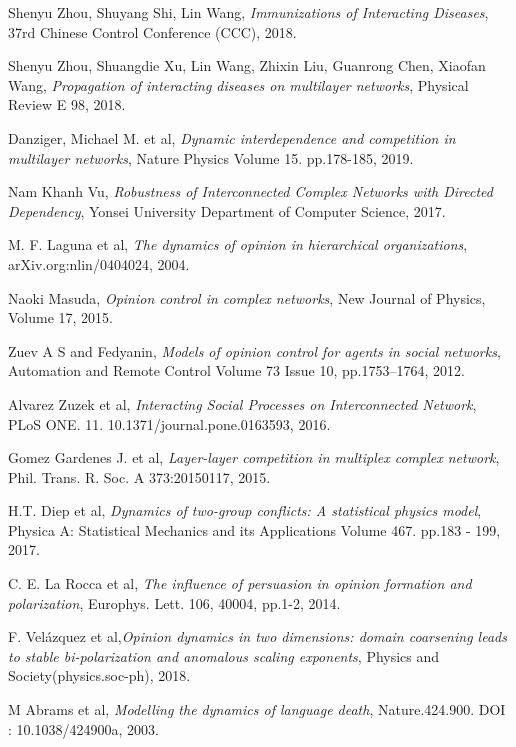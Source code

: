 \documentclass[english]{cccconf}
\begin{document}
\begin{thebibliography}{0}
Shenyu Zhou, Shuyang Shi, Lin Wang, \textit{Immunizations of Interacting Diseases}, 37rd Chinese Control Conference (CCC), 2018.

Shenyu Zhou, Shuangdie Xu, Lin Wang, Zhixin Liu, Guanrong Chen, Xiaofan Wang, \textit{Propagation of interacting diseases on multilayer networks}, Physical Review E 98, 2018. 

Danziger, Michael M. et al, \textit{Dynamic interdependence and competition in multilayer networks}, Nature Physics Volume 15. pp.178-185, 2019.

Nam Khanh Vu, \textit{Robustness of Interconnected Complex Networks with Directed Dependency}, Yonsei University Department of Computer Science, 2017.

M. F. Laguna et al, \textit{The dynamics of opinion in hierarchical organizations}, arXiv.org:nlin/0404024, 2004. 

Naoki Masuda, \textit{Opinion control in complex networks}, New Journal of Physics, Volume 17, 2015.

Zuev A S and Fedyanin, 
\textit{Models of opinion control for agents in social networks}, Automation and Remote Control Volume 73 Issue 10, pp.1753–1764, 2012. 

Alvarez Zuzek et al, \textit{Interacting Social Processes on Interconnected Network}, PLoS ONE. 11. 10.1371/journal.pone.0163593, 2016.

Gomez Gardenes J. et al, \textit{Layer-layer competition in multiplex complex network}, Phil. Trans. R. Soc. A 373:20150117, 2015.

H.T. Diep et al, \textit{Dynamics of two-group conflicts: A statistical physics model}, Physica A: Statistical Mechanics and its Applications Volume 467. pp.183 - 199, 2017.

C. E. La Rocca et al, \textit{The influence of persuasion in opinion formation and polarization}, Europhys. Lett. 106, 40004, pp.1-2, 2014.

F. Vel{\'a}zquez et al,\textit{Opinion dynamics in two dimensions: domain coarsening leads to stable bi-polarization and anomalous scaling exponents}, Physics and Society(physics.soc-ph), 2018. 

M Abrams et al, \textit{Modelling the dynamics of language death}, Nature.424.900. DOI : 10.1038/424900a, 2003.


\end{thebibliography}
\end{document}
